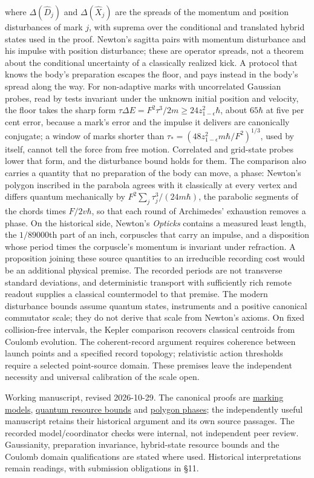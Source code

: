 \documentclass[11pt,a4paper]{article}
\begin{document}
where \(\Delta(\hat D_j)\) and \(\Delta(\hat X_j)\) are the spreads of
the momentum and position disturbances of mark \(j\), with suprema over
the conditional and translated hybrid states used in the proof. Newton's
sagitta pairs with momentum disturbance and his impulse with position
disturbance; these are operator spreads, not a theorem about the
conditional uncertainty of a classically realized kick. A protocol that
knows the body's preparation escapes the floor, and pays instead in the
body's spread along the way. For non-adaptive marks with uncorrelated
Gaussian probes, read by tests invariant under the unknown initial
position and velocity, the floor takes the sharp form
\(\tau\Delta E=F^2\tau^3/2m\ge24z_{1-\epsilon}^2\hbar\), about
\(65\hbar\) at five per cent error, because a mark's error and the
impulse it delivers are canonically conjugate; a window of marks shorter
than \(\tau_*=(48z_{1-\epsilon}^2m\hbar/F^2)^{1/3}\), used by itself,
cannot tell the force from free motion. Correlated and grid-state probes
lower that form, and the disturbance bound holds for them. The
comparison also carries a quantity that no preparation of the body can
move, a phase: Newton's polygon inscribed in the parabola agrees with it
classically at every vertex and differs quantum mechanically by
\(F^2\sum_j\tau_j^3/(24m\hbar)\), the parabolic segments of the chords
times \(F/2v\hbar\), so that each round of Archimedes' exhaustion
removes a phase. On the historical side, Newton's \emph{Opticks}
contains a measured least length, the \(1/89000\)th part of an inch,
corpuscles that carry an impulse, and a disposition whose period times
the corpuscle's momentum is invariant under refraction. A proposition
joining these source quantities to an irreducible recording cost would
be an additional physical premise. The recorded periods are not
transverse standard deviations, and deterministic transport with
sufficiently rich remote readout supplies a classical countermodel to
that premise. The modern disturbance bounds assume quantum states,
instruments and a positive canonical commutator scale; they do not
derive that scale from Newton's axioms. On fixed collision-free
intervals, the Kepler comparison recovers classical centroids from
Coulomb evolution. The coherent-record argument requires coherence
between launch points and a specified record topology; relativistic
action thresholds require a selected point-source domain. These premises
leave the independent necessity and universal calibration of the scale
open.

Working manuscript, revised 2026-10-29. The canonical proofs are
\href{mark-cost-and-statistical-floor.md}{marking models},
\href{record-distance-path-length.md}{quantum resource bounds} and
\href{cut-measure-newton.md\#weyl-lifting-and-polygon-phases}{polygon
phases}; the independently useful manuscript retains their historical
argument and its own source passages. The recorded model/coordinator
checks were internal, not independent peer review. Gaussianity,
preparation invariance, hybrid-state resource bounds and the Coulomb
domain qualifications are stated where used. Historical interpretations
remain readings, with submission obligations in §11.
\end{document}
